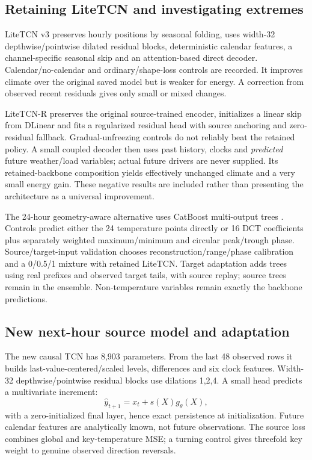 \subsection{Retaining LiteTCN and investigating extremes}
LiteTCN v3 preserves hourly positions by seasonal folding, uses width-32 depthwise/pointwise dilated residual blocks, deterministic calendar features, a channel-specific seasonal skip and an attention-based direct decoder. Calendar/no-calendar and ordinary/shape-loss controls are recorded. It improves climate over the original saved model but is weaker for energy. A correction from observed recent residuals gives only small or mixed changes.

LiteTCN-R preserves the original source-trained encoder, initializes a linear skip from DLinear and fits a regularized residual head with source anchoring and zero-residual fallback. Gradual-unfreezing controls do not reliably beat the retained policy. A small coupled decoder then uses past history, clocks and \emph{predicted} future weather/load variables; actual future drivers are never supplied. Its retained-backbone composition yields effectively unchanged climate and a very small energy gain. These negative results are included rather than presenting the architecture as a universal improvement.

The 24-hour geometry-aware alternative uses CatBoost multi-output trees \citep{CatBoost}. Controls predict either the 24 temperature points directly or 16 DCT coefficients plus separately weighted maximum/minimum and circular peak/trough phase. Source/target-input validation chooses reconstruction/range/phase calibration and a 0/0.5/1 mixture with retained LiteTCN. Target adaptation adds trees using real prefixes and observed target tails, with source replay; source trees remain in the ensemble. Non-temperature variables remain exactly the backbone predictions.

\subsection{New next-hour source model and adaptation}
The new causal TCN has 8,903 parameters. From the last 48 observed rows it builds last-value-centered/scaled levels, differences and six clock features. Width-32 depthwise/pointwise residual blocks use dilations 1,2,4. A small head predicts a multivariate increment:
\begin{equation}
\widehat y_{t+1}=x_t+s(X)g_\theta(X),
\end{equation}
with a zero-initialized final layer, hence exact persistence at initialization. Future calendar features are analytically known, not future observations. The source loss combines global and key-temperature MSE; a turning control gives threefold key weight to genuine observed direction reversals.

